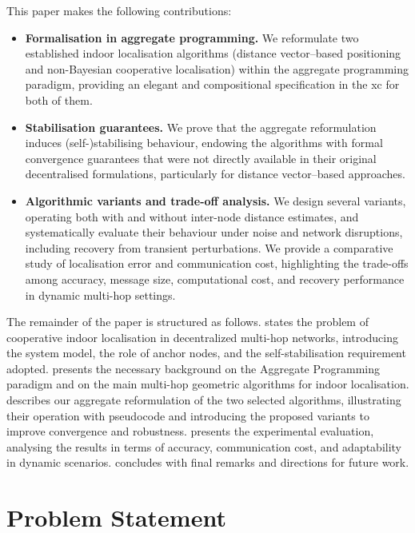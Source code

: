 \documentclass[runningheads]{llncs}
\begin{document}
This paper makes the following contributions:
\begin{itemize}
    \item \textbf{Formalisation in aggregate programming.} We reformulate two established indoor localisation algorithms (distance vector–based positioning and non-Bayesian cooperative localisation) within the aggregate programming paradigm, providing an elegant and compositional specification in the \ac{xc} \cite{jss:xc} for both of them.
    
    \item \textbf{Stabilisation guarantees.} We prove that the aggregate reformulation induces (self-)stabilising behaviour, endowing the algorithms with formal convergence guarantees that were not directly available in their original decentralised formulations, particularly for distance vector–based approaches.
    
    \item \textbf{Algorithmic variants and trade-off analysis.} We design several variants, operating both with and without inter-node distance estimates, and systematically evaluate their behaviour under noise and network disruptions, including recovery from transient perturbations. We provide a comparative study of localisation error and communication cost, highlighting the trade-offs among accuracy, message size, computational cost, and recovery performance in dynamic multi-hop settings.
\end{itemize}

The remainder of the paper is structured as follows.
 states the problem of cooperative indoor localisation in decentralized multi-hop networks, introducing the system model, the role of anchor nodes, and the self-stabilisation requirement adopted.
 presents the necessary background on the Aggregate Programming paradigm and on the main multi-hop geometric algorithms for indoor localisation.
 describes our aggregate reformulation of the two selected algorithms, illustrating their operation with pseudocode and introducing the proposed variants to improve convergence and robustness.
 presents the experimental evaluation, analysing the results in terms of accuracy, communication cost, and adaptability in dynamic scenarios.
 concludes with final remarks and directions for future work.

\section{Problem Statement} \label{sec:problem}
\end{document}
